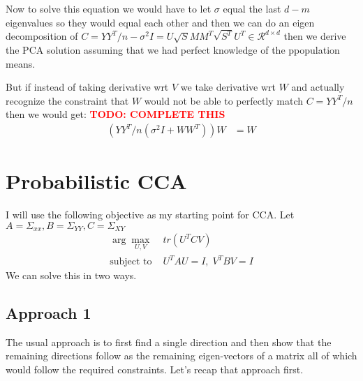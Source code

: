 \documentclass[11pt]{article}
\newcommand{\todo}[1]{\textbf{\textcolor{red}{TODO: #1}}}
\begin{document}
Now to solve this equation we would have to let $\sigma$ equal the
last $d-m$ eigenvalues so they would equal each other and then we can
 do an eigen decomposition
of $C = YY^T/n - \sigma^2I = U\sqrt{S}MM^T\sqrt{S^T}U^T \in \mathcal{R}^{d \times
  d}$ then we derive the PCA solution assuming that we had perfect
knowledge of the ppopulation means.

But if instead of taking derivative wrt $V$ we take derivative wrt $W$
and actually recognize the constraint that $W$ would not be able to
perfectly match $C=YY^T/n$  then we would get: \todo{COMPLETE THIS}
\begin{align}
  (YY^T/n(\sigma^2I+WW^T))W &= W
\end{align}

\section{Probabilistic CCA}
I will use the following objective as my starting point for CCA.
Let $A=\Sigma_{xx}, B=\Sigma_{YY}, C=\Sigma_{XY}$
\begin{align}
  \arg\max_{U,V} \;& tr(U^T C V)\\
  \text{subject to } & U^TAU=I,\; V^TBV=I
\end{align}
We can solve this in two ways.
\subsection{Approach 1}
The usual approach is to first find a single direction and then show
that the remaining directions follow as the remaining eigen-vectors of
a matrix all of which would follow the required constraints. Let's
recap that approach first.
\end{document}
